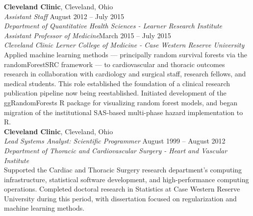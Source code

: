 \documentclass[letterpaper,11pt]{nih}
\begin{document}
\textbf{Cleveland Clinic}, Cleveland, Ohio\\
{\em Assistant Staff} \hfill {August 2012 -- July 2015}\\
{\em Department of Quantitative Health Sciences - Learner Research Institute}\\
{\em Assistant Professor of Medicine}\hfill {March 2015 -- July 2015\\
{\em Cleveland Clinic Lerner College of Medicine - Case Western Reserve University}\\

Applied machine learning methods — principally random survival forests via the randomForestSRC framework — to cardiovascular and thoracic outcomes research in collaboration with cardiology and surgical staff, research fellows, and medical students. This role established the foundation of a clinical research publication pipeline now being reestablished. Initiated development of the ggRandomForests R package for visualizing random forest models, and began migration of the institutional SAS-based multi-phase hazard implementation to R.\\

% 
% 
% 
% 
 
\textbf{Cleveland Clinic}, Cleveland, Ohio\\
{\em Lead Systems Analyst: Scientific Programmer} \hfill {August 1999 -- August 2012}\\
{\em Department of Thoracic and Cardiovascular Surgery - Heart and Vascular Institute}\\

Supported the Cardiac and Thoracic Surgery research department's computing infrastructure, statistical software development, and high-performance computing operations. Completed doctoral research in Statistics at Case Western Reserve University during this period, with dissertation focused on regularization and machine learning methods.\\

}
\end{document}
